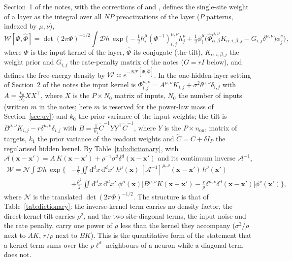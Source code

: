 \documentclass[11pt,a4paper]{article}
\newcommand{\D}{\mathcal D}
\newcommand{\W}{\mathcal W}
\newcommand{\F}{\mathcal F}
\newcommand{\dd}{\mathrm d}
\newcommand{\Ct}{\tilde C}
\begin{document}
Section~1 of the notes, with the corrections of  and , defines the single-site weight of a layer as the integral over all $NP$ preactivations of the layer ($P$ patterns, indexed by $\mu,\nu$),
\begin{equation}
  \W[\Phi,\hat\Phi] = \det(2\pi\Phi)^{-1/2}\int\D h\,\exp\Big\{-\tfrac12h^{\mu}_i(\Phi^{-1})^{\mu,\nu}_{i,j}h^{\nu}_j + \tfrac12\phi^{\mu}_i\big(\hat\Phi^{\mu,\nu}_{\alpha,\beta}K_{\alpha,i,\beta,j} - G_{i,j}\delta^{\mu,\nu}\big)\phi^{\nu}_j\Big\},
  \label{eq:W-lattice}
\end{equation}
where $\Phi$ is the input kernel of the layer, $\hat\Phi$ its conjugate (the tilt), $K_{\alpha,i,\beta,j}$ the weight prior and $G_{i,j}$ the rate-penalty matrix of the notes ($G = rI$ below), and defines the free-energy density by $\W\asymp e^{-N\F[\Phi,\hat\Phi]}$.
In the one-hidden-layer setting of Section~2 of the notes the input kernel is $\Phi^{\mu,\nu}_{i,j} = A^{\mu,\nu}K_{i,j} + \sigma^2\delta^{\mu,\nu}\delta_{i,j}$ with $A = \frac{k_0}{N_0}XX^{\top}$, where $X$ is the $P\times N_0$ matrix of inputs, $N_0$ the number of inputs (written $m$ in the notes; here $m$ is reserved for the power-law mass of Section~\ref{sec:uv}) and $k_0$ the prior variance of the input weights; the tilt is $B^{\mu,\nu}K_{i,j} - r\delta^{\mu,\nu}\delta_{i,j}$ with $B = \frac1{k_1}\Ct^{-1}YY^{\top}\Ct^{-1}$, where $Y$ is the $P\times n_{\mathrm{out}}$ matrix of targets, $k_1$ the prior variance of the readout weights and $\Ct = C+\delta I_P$ the regularised hidden kernel. By Table~\ref{tab:dictionary}, with $\mathcal A(\mathbf x-\mathbf x') = A\,K(\mathbf x-\mathbf x') + \rho^{-1}\sigma^2\delta^d(\mathbf x-\mathbf x')$ and its continuum inverse $\mathcal A^{-1}$,
\begin{equation}
\begin{aligned}
  \W = \mathcal N\int\D h\,\exp\Big\{&-\tfrac12\iint\dd^dx\,\dd^dx'\;h^{\mu}(\mathbf x)\,[\mathcal A^{-1}]^{\mu,\nu}(\mathbf x-\mathbf x')\,h^{\nu}(\mathbf x')\\
  &+ \tfrac{\rho^2}{2}\iint\dd^dx\,\dd^dx'\;\phi^{\mu}(\mathbf x)\Big[B^{\mu,\nu}K(\mathbf x-\mathbf x') - \tfrac{r}{\rho}\delta^{\mu,\nu}\delta^d(\mathbf x-\mathbf x')\Big]\phi^{\nu}(\mathbf x')\Big\},
\end{aligned}
  \label{eq:W-cont}
\end{equation}
where $\mathcal N$ is the translated $\det(2\pi\Phi)^{-1/2}$. The structure is that of Table~\ref{tab:dictionary}: the inverse-kernel term carries no density factor, the direct-kernel tilt carries $\rho^2$, and the two site-diagonal terms, the input noise and the rate penalty, carry one power of $\rho$ less than the kernel they accompany ($\sigma^2/\rho$ next to $AK$, $r/\rho$ next to $BK$). This is the quantitative form of the statement that a kernel term sums over the $\rho\ell^d$ neighbours of a neuron while a diagonal term does not.
\end{document}
